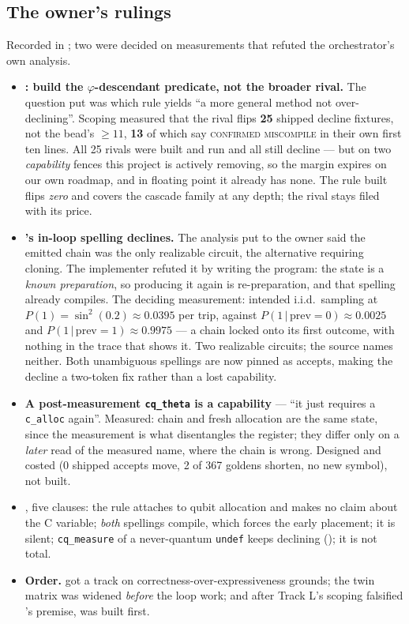 \subsection*{The owner's rulings}
Recorded in ; two were decided on measurements that refuted the orchestrator's own
analysis.
\begin{itemize}
  \item \textbf{: build the \(\varphi\)-descendant predicate, not the broader rival.} The question
    put was which rule yields ``a more general method not over-declining''. Scoping measured that the rival
    flips \textbf{25} shipped decline fixtures, not the bead's \(\ge 11\), \textbf{13} of which say
    \textsc{confirmed miscompile} in their own first ten lines. All 25 rivals were built and run and all
    still decline --- but on two \emph{capability} fences this project is actively removing, so the margin
    expires on our own roadmap, and in floating point it already has none. The rule built flips \emph{zero}
    and covers the cascade family at any depth; the rival stays filed with its price.
  \item \textbf{'s in-loop spelling declines.} The analysis put to the owner said the emitted chain
    was the only realizable circuit, the alternative requiring cloning. The implementer refuted it by
    writing the program: the state is a \emph{known preparation}, so producing it again is re-preparation,
    and that spelling already compiles. The deciding measurement: intended i.i.d.\ sampling at
    \(P(1)=\sin^2(0.2)\approx0.0395\) per trip, against \(P(1\,|\,\mathrm{prev}{=}0)\approx0.0025\) and
    \(P(1\,|\,\mathrm{prev}{=}1)\approx0.9975\) --- a chain locked onto its first outcome, with nothing in
    the trace that shows it. Two realizable circuits; the source names neither. Both unambiguous spellings
    are now pinned as accepts, making the decline a two-token fix rather than a lost capability.
  \item \textbf{A post-measurement \texttt{cq\_theta} is a capability} --- ``it just requires a
    \texttt{c\_alloc} again''. Measured: chain and fresh allocation are the same state, since the
    measurement is what disentangles the register; they differ only on a \emph{later} read of the measured
    name, where the chain is wrong. Designed and costed (0 shipped accepts move, 2 of 367 goldens shorten,
    no new symbol), not built.
  \item \textbf{}, five clauses: the rule attaches to qubit allocation and makes no claim about the
    C variable; \emph{both} spellings compile, which forces the early placement; it is silent;
    \texttt{cq\_measure} of a never-quantum \texttt{undef} keeps declining (); it is not total.
  \item \textbf{Order.}  got a track on correctness-over-expressiveness grounds; the twin matrix
    was widened \emph{before} the loop work; and after Track L's scoping falsified 's premise,
     was built first.
\end{itemize}

